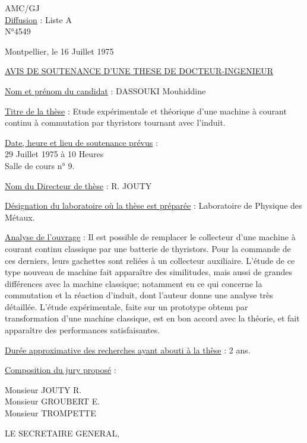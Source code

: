 
AMC/GJ\\
\uline{Diffusion} : Liste A\\
N°4549

Montpellier, le 16 Juillet 1975

\uline{AVIS DE SOUTENANCE D'UNE THESE DE DOCTEUR-INGENIEUR}

\uline{Nom et prénom du candidat} : DASSOUKI Mouhiddine

\uline{Titre de la thèse} : Etude expérimentale et théorique d'une machine à courant continu à commutation par thyristors tournant avec l'induit.

\uline{Date, heure et lieu de soutenance prévus} :\\
29 Juillet 1975 à 10 Heures\\
Salle de cours n° 9.

\uline{Nom du Directeur de thèse} : R. JOUTY

\uline{Désignation du laboratoire où la thèse est préparée} : Laboratoire de Physique des Métaux.

\uline{Analyse de l'ouvrage} : Il est possible de remplacer le collecteur d'une machine à courant continu classique par une batterie de thyristors. Pour la commande de ces derniers, leurs gachettes sont reliées à un collecteur auxiliaire. L'étude de ce type nouveau de machine fait apparaître des similitudes, mais aussi de grandes différences avec la machine classique; notamment en ce qui concerne la commutation et la réaction d'induit, dont l'auteur donne une analyse très détaillée. L'étude expérimentale, faite sur un prototype obtenu par transformation d'une machine classique, est en bon accord avec la théorie, et fait apparaître des performances satisfaisantes.

\uline{Durée approximative des recherches ayant abouti à la thèse} : 2 ans.

\uline{Composition du jury proposé} :

Monsieur JOUTY R.\\
Monsieur GROUBERT E.\\
Monsieur TROMPETTE

LE SECRETAIRE GENERAL,


